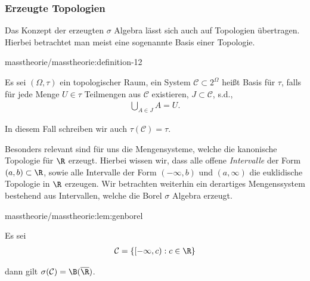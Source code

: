 \documentclass[letterpaper,10pt,german]{jupyterBook}
\begin{document}
\subsubsection{Erzeugte Topologien}
\label{\detokenize{masstheorie/masstheorie:erzeugte-topologien}}\label{\detokenize{masstheorie/masstheorie:s-gentop}}
\par
Das Konzept der erzeugten \(\sigma\) Algebra lässt sich auch auf Topologien übertragen. Hierbei betrachtet man meist eine sogenannte Basis einer Topologie.
\begin{definition}{}{masstheorie/masstheorie:definition-12}



\par
Es sei \((\Omega,\tau)\) ein topologischer Raum, ein System \(\mathcal{C}\subset 2^\Omega\) heißt Basis für \(\tau\), falls für jede Menge \(U\in\tau\) Teilmengen aus \(\mathcal{C}\) existieren, \(J\subset\mathcal{C}\), s.d.,
\begin{align*}
\bigcup_{A\in J} A = U.
\end{align*}
\par
In diesem Fall schreiben wir auch \(\tau(\mathcal{C})=\tau\).
\end{definition}

\par
Besonders relevant sind für uns die Mengensysteme, welche die kanonische Topologie für \(\R\) erzeugt. Hierbei wissen wir, dass alle offene \emph{Intervalle} der Form \((a,b)\subset \R\), sowie alle Intervalle der Form \((-\infty, b)\) und \((a, \infty)\) die euklidische Topologie in \(\R\) erzeugen. Wir betrachten weiterhin ein derartiges Mengenssystem bestehend aus Intervallen, welche die Borel \(\sigma\) Algebra erzeugt.
\begin{lemma}{}{masstheorie/masstheorie:lem:genborel}



\par
Es sei
\begin{align*}
\mathcal{C} = \{ [-\infty, c):c\in\R\}
\end{align*}
\par
dann gilt \(\sigma(\mathcal{C}) = \B(\overline{\R})\).
\end{lemma}
\end{document}
